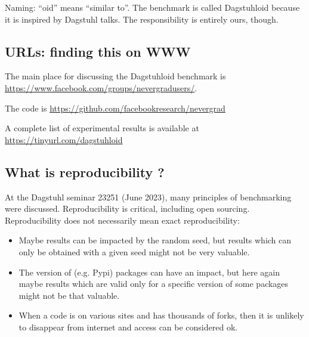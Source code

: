 \documentclass{article}
\begin{document}

Naming: “oid” means “similar to”. The benchmark is called Dagstuhloid because it is inspired by Dagstuhl talks. The responsibility is entirely ours, though.

\subsection{URLs: finding this on WWW}
The main place for discussing the Dagstuhloid benchmark is \url{https://www.facebook.com/groups/nevergradusers/}. 

The code is \url{https://github.com/facebookresearch/nevergrad}

A complete list of experimental results is available at \url{https://tinyurl.com/dagstuhloid}

\subsection{What is reproducibility ?}\label{repro}\label{div}
At the Dagstuhl seminar 23251 (June 2023), many principles of benchmarking were discussed. 
Reproducibility is critical, including open sourcing. 
Reproducibility does not necessarily mean exact reproducibility:
\begin{itemize}
\item Maybe results can be impacted by the random seed, but results which can only be obtained with a given seed might
not be very valuable.
\item The version of (e.g. Pypi) packages can have an impact, but here again maybe results which are valid only for a
specific version of some packages might not be that valuable.
\item When a code is on various sites and has thousands of forks, then it is unlikely to disappear from internet and
access can be considered ok.
\end{itemize}
\end{document}
